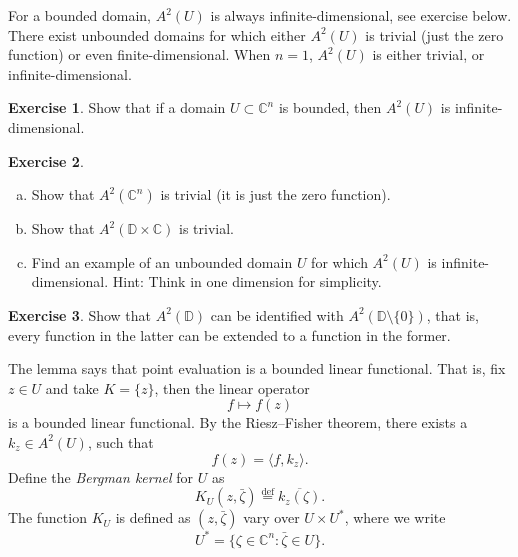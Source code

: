 \documentclass[12pt,openany]{book}
\newcommand{\linnprod}[2]{\langle #1 , #2 \rangle}
\newcommand{\C}{{\mathbb{C}}}
\newcommand{\D}{{\mathbb{D}}}
\newcommand{\myindex}[1]{#1\index{#1}}
\theoremstyle{plain}
\theoremstyle{remark}
\theoremstyle{definition}
\newenvironment{exbox}{%
    \def\FrameCommand{\vrule width 1pt \relax\hspace{10pt}}%
    \MakeFramed {\advance \hsize -\width \FrameRestore}%
}{%
    \endMakeFramed
}
\newenvironment{exparts}{%
    \leavevmode\begin{enumerate}[a),noitemsep,topsep=0pt,parsep=0pt,partopsep=0pt]
}{%
    \end{enumerate}
}
\theoremstyle{exercise}
\newtheorem{exercise}{Exercise}[section]
\theoremstyle{example}
\begin{document}
For a bounded domain, $A^2(U)$ is always infinite-dimensional, see exercise
below.  There exist unbounded domains for which either 
$A^2(U)$ is trivial (just the zero function) or even finite-dimensional.
When $n=1$, $A^2(U)$ is either trivial, or infinite-dimensional.

\begin{exbox}
\begin{exercise}
Show that if a domain $U \subset \C^n$ is bounded, then $A^2(U)$ is
infinite-dimensional.
\end{exercise}

\begin{exercise}
\begin{exparts}
\item
Show that $A^2(\C^n)$ is trivial (it is just the zero function).
\item
Show that $A^2(\D \times \C)$ is trivial.
\item
Find an example of an unbounded domain $U$ for which $A^2(U)$ is
infinite-dimensional.
Hint: Think in one dimension for simplicity.
\end{exparts}
\end{exercise}

\begin{exercise}
Show that $A^2(\D)$ can be identified with $A^2(\D \setminus \{ 0 \})$,
that is, every function in the latter can be extended to a function in the
former.
\end{exercise}
\end{exbox}

The lemma says that 
point evaluation is a bounded linear
functional.
That is, fix $z \in U$ and take $K= \{ z \}$, then the linear operator
\begin{equation*}
f \mapsto f(z)
\end{equation*}
is a bounded linear functional.  By the Riesz--Fisher theorem, there exists
a $k_z \in A^2(U)$, such that
\begin{equation*}
f(z) = \linnprod{f}{k_z} .
\end{equation*}
Define the \emph{\myindex{Bergman kernel}} for $U$ as
%
\begin{equation*}
K_U(z,\bar{\zeta}) \overset{\text{def}}{=} \overline{k_z(\zeta)} .
\end{equation*}
The function $K_U$ is defined as $(z,\bar{\zeta})$ vary over
%
$U \times U^*$, where we write
\begin{equation*}
U^* = \{ \zeta \in \C^n : \bar{\zeta} \in U \}.
\end{equation*}
\end{document}
